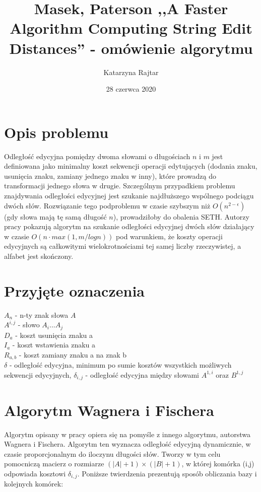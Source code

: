 \documentclass[12pt]{article}
\title{Masek, Paterson ,,A Faster Algorithm Computing String Edit Distances'' - omówienie algorytmu}
\author{Katarzyna Rajtar}
\date{28 czerwca 2020}
\begin{document}
\maketitle

\section{Opis problemu}

Odległość edycyjna pomiędzy dwoma słowami o długościach $n$ i $m$ jest definiowana jako minimalny koszt sekwencji operacji edytujących (dodania znaku, usunięcia znaku, zamiany jednego znaku w inny), które prowadzą do transformacji jednego słowa w drugie. Szczególnym przypadkiem problemu znajdywania odległości edycyjnej jest szukanie najdłuższego wspólnego podciągu dwóch słów. Rozwiązanie tego podproblemu w czasie szybszym niż $O(n^{2-\epsilon})$ (gdy słowa mają tę samą długość $n$), prowadziłoby do obalenia SETH. Autorzy pracy pokazują algorytm na szukanie odległości edycyjnej dwóch słów działający w czasie $O(n \cdot max(1,m/log n))$ pod warunkiem, że koszty operacji edycyjnych są całkowitymi wielokrotnościami tej samej liczby rzeczywistej, a alfabet jest skończony.

\section{Przyjęte oznaczenia}

$A_n$ - n-ty znak słowa $A$\\
$A^{i,j}$ - słowo $A_i...A_j$\\
$D_a$ - koszt usunięcia znaku a\\
$I_a$ - koszt wstawienia znaku a\\
$R_{a,b}$ - koszt zamiany znaku a na znak b\\
$\delta$ - odległość edycyjna, minimum po sumie kosztów wszystkich możliwych sekwencji edycyjnych,
$\delta_{i,j}$ - odległość edycyjna między słowami $A^{1,i}$ oraz $B^{1,j}$\\

\section{Algorytm Wagnera i Fischera}

Algorytm opisany w pracy opiera się na pomyśle z innego algorytmu, autorstwa Wagnera i Fischera. Algorytm ten wyznacza odległość edycyjną dynamicznie, w czasie proporcjonalnym do iloczynu długości słów. Tworzy w tym celu pomocniczą macierz o rozmiarze $(|A|+1) \times (|B|+1)$, w której komórka (i,j) odpowiada kosztowi $\delta_{i,j}$. Poniższe twierdzenia prezentują sposób obliczania bazy i kolejnych komórek:\\
\end{document}
